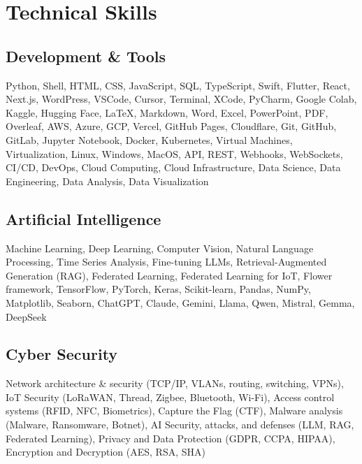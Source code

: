\documentclass[11pt,a4paper,sans]{moderncv}
\begin{document}
\section{Technical Skills}
\subsection{Development \& Tools}
Python, Shell, HTML, CSS, JavaScript, SQL, TypeScript, Swift, Flutter, React, Next.js, WordPress, VSCode, Cursor, Terminal, XCode, PyCharm, Google Colab, Kaggle, Hugging Face, LaTeX, Markdown, Word, Excel, PowerPoint, PDF, Overleaf, AWS, Azure, GCP, Vercel, GitHub Pages, Cloudflare, Git, GitHub, GitLab, Jupyter Notebook, Docker, Kubernetes, Virtual Machines, Virtualization, Linux, Windows, MacOS, API, REST, Webhooks, WebSockets, CI/CD, DevOps, Cloud Computing, Cloud Infrastructure, Data Science, Data Engineering, Data Analysis, Data Visualization

\subsection{Artificial Intelligence}
Machine Learning, Deep Learning, Computer Vision, Natural Language Processing, Time Series Analysis, Fine-tuning LLMs, Retrieval-Augmented Generation (RAG), Federated Learning, Federated Learning for IoT, Flower framework, TensorFlow, PyTorch, Keras, Scikit-learn, Pandas, NumPy, Matplotlib, Seaborn, ChatGPT, Claude, Gemini, Llama, Qwen, Mistral, Gemma, DeepSeek

\subsection{Cyber Security}
Network architecture \& security (TCP/IP, VLANs, routing, switching, VPNs), IoT Security (LoRaWAN, Thread, Zigbee, Bluetooth, Wi-Fi), Access control systems (RFID, NFC, Biometrics), Capture the Flag (CTF), Malware analysis (Malware, Ransomware, Botnet), AI Security, attacks, and defenses (LLM, RAG, Federated Learning), Privacy and Data Protection (GDPR, CCPA, HIPAA), Encryption and Decryption (AES, RSA, SHA)
\end{document}
